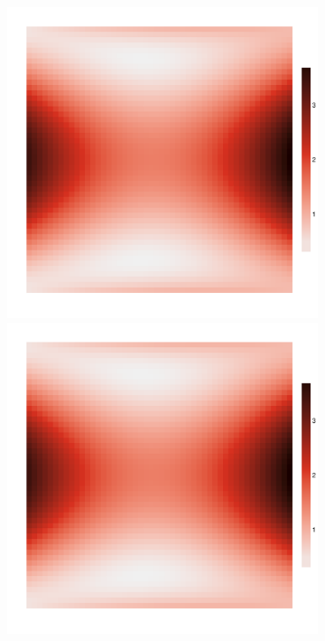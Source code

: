 \documentclass{article}
\begin{document}
\begin{figure}
\begin{subfigure}{0.3\textwidth}
		\includegraphics[width=\linewidth]{figures/y112}\\
		\includegraphics[width=\linewidth]{figures/y113}\\

\end{subfigure}
\end{figure}
\end{document}
